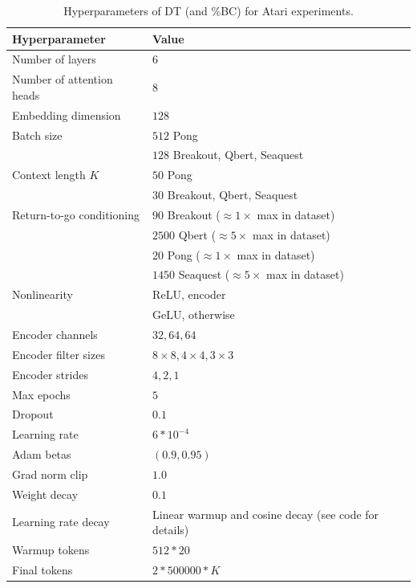 \begin{table}[ht]
\caption{Hyperparameters of DT (and \%BC) for Atari experiments.}
\vskip 0.15in
\begin{center}
\begin{small}
\begin{tabular}{ll}
\toprule
\textbf{Hyperparameter} & \textbf{Value}  \\
\midrule
Number of layers & $6$  \\ 
Number of attention heads    & $8$  \\
Embedding dimension    & $128$  \\ 
Batch size   & $512$ Pong \\
& $128$ Breakout, Qbert, Seaquest\\ 
Context length $K$ & $50$ Pong \\
& $30$ Breakout, Qbert, Seaquest\\
Return-to-go conditioning & $90$ Breakout ($\approx 1\times$ max in dataset) \\
& $2500$ Qbert ($\approx 5\times$ max in dataset) \\
& $20$ Pong ($\approx 1\times$ max in dataset) \\
& $1450$ Seaquest ($\approx 5\times$ max in dataset) \\
Nonlinearity & ReLU, encoder \\
& GeLU, otherwise \\
Encoder channels & $32, 64, 64$ \\
Encoder filter sizes & $8 \times 8, 4 \times 4, 3 \times 3$ \\
Encoder strides & $4, 2, 1$ \\
Max epochs & $5$ \\
Dropout & $0.1$ \\
Learning rate & $6*10^{-4}$ \\
Adam betas & $(0.9, 0.95)$ \\
Grad norm clip & $1.0$ \\
Weight decay & $0.1$ \\
Learning rate decay & Linear warmup and cosine decay (see code for details) \\
Warmup tokens & $512*20$ \\
Final tokens & $2*500000*K$ \\

\bottomrule
\end{tabular}
\end{small}
\label{tbl:atari_hyperparameters}
\end{center}
\end{table} 


